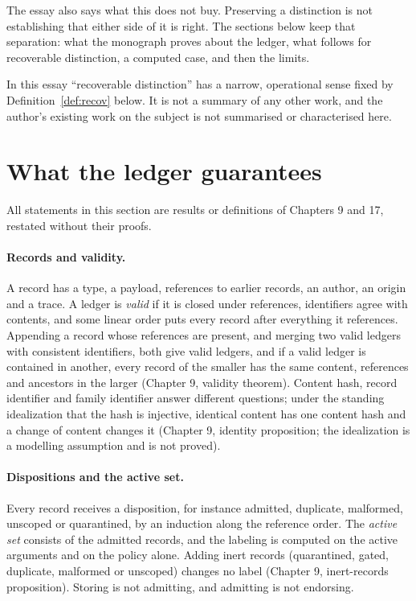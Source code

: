 \documentclass[11pt]{article}
\theoremstyle{plain}
\theoremstyle{definition}
\theoremstyle{remark}
\begin{document}
The essay also says what this does not buy. Preserving a distinction is not establishing that either side of it is right. The sections below keep that separation: what the monograph proves about the ledger, what follows for recoverable distinction, a computed case, and then the limits.

In this essay ``recoverable distinction'' has a narrow, operational sense fixed by Definition~\ref{def:recov} below. It is not a summary of any other work, and the author's existing work on the subject is not summarised or characterised here.

\section{What the ledger guarantees}\label{sec:ledger}

All statements in this section are results or definitions of Chapters 9 and 17, restated without their proofs.

\paragraph{Records and validity.} A record has a type, a payload, references to earlier records, an author, an origin and a trace. A ledger is \emph{valid} if it is closed under references, identifiers agree with contents, and some linear order puts every record after everything it references. Appending a record whose references are present, and merging two valid ledgers with consistent identifiers, both give valid ledgers, and if a valid ledger is contained in another, every record of the smaller has the same content, references and ancestors in the larger (Chapter 9, validity theorem). Content hash, record identifier and family identifier answer different questions; under the standing idealization that the hash is injective, identical content has one content hash and a change of content changes it (Chapter 9, identity proposition; the idealization is a modelling assumption and is not proved).

\paragraph{Dispositions and the active set.} Every record receives a disposition, for instance admitted, duplicate, malformed, unscoped or quarantined, by an induction along the reference order. The \emph{active set} consists of the admitted records, and the labeling is computed on the active arguments and on the policy alone. Adding inert records (quarantined, gated, duplicate, malformed or unscoped) changes no label (Chapter 9, inert-records proposition). Storing is not admitting, and admitting is not endorsing.
\end{document}
